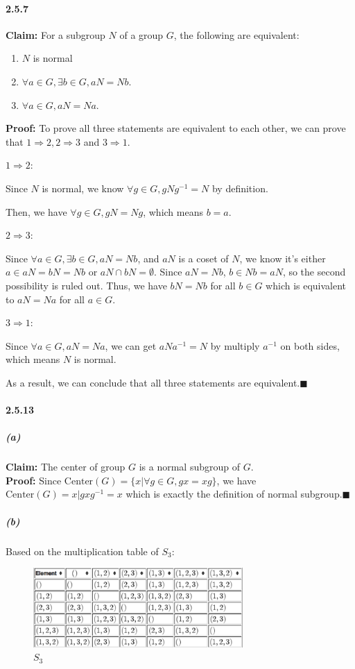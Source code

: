 \documentclass[11pt]{article}
\begin{document}
	\paragraph{2.5.7}
		\textbf{Claim:} For a subgroup $N$ of a group $G$, the following are equivalent:
		\begin{enumerate}
			\item $N$ is normal
			\item $\forall a \in G, \exists b \in G, aN = Nb$.
			\item $\forall a \in G, aN = Na$.
		\end{enumerate}
		
		\textbf{Proof:} To prove all three statements are equivalent to each other, we can prove that $1 \Rightarrow 2, 2 \Rightarrow 3 $ and $3 \Rightarrow 1$.
		
		$1 \Rightarrow 2$:
		
			Since $N$ is normal, we know $\forall g \in G, gNg^{-1} = N$ by definition. 
			
			Then, we have $\forall g \in G, gN = Ng$, which means $b = a$.
			
		$2 \Rightarrow 3$:
			
			Since $\forall a \in G, \exists b \in G, aN = Nb$, and $aN$ is a coset of $N$, we know it's either $a \in aN = bN = Nb$ or $aN \cap bN = \emptyset$. Since $aN = Nb$, $b \in Nb = aN$, so the second possibility is ruled out. Thus, we have $bN = Nb$ for all $b \in G$ which is equivalent to $aN = Na$ for all $a \in G$.
		
		$3 \Rightarrow 1$:
		
			Since $\forall a \in G, aN = Na$, we can get $aNa^{-1} = N$ by multiply $a^{-1}$ on both sides, which means $N$ is normal.
			
			As a result, we can conclude that all three statements are equivalent.$\blacksquare$ 
	\paragraph{2.5.13}
		\subparagraph{(a)}
			\textbf{Claim:} The center of group $G$ is a normal subgroup of $G$.\\
			
			\textbf{Proof:}
			Since $\mathrm{Center}(G) = \{x | \forall g \in G, gx = xg\}$, we have $\mathrm{Center}(G) = {x | gxg^{-1} = x}$ which is exactly the definition of normal subgroup.$\blacksquare$
		\subparagraph{(b)}Based on the multiplication table of $S_3$:
		\begin{figure}[H]
        	\begin{center}
        \includegraphics[width=8cm]{./imgs/S_3.png}
        	\caption{$S_3$}
        	\end{center}
    	\end{figure}
\end{document}
